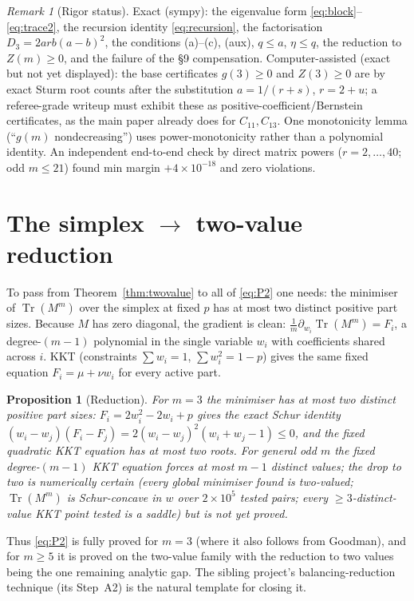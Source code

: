 \documentclass[11pt]{article}
\newtheorem{proposition}[theorem]{Proposition}
\theoremstyle{remark}
\newtheorem{remark}[theorem]{Remark}
\newcommand{\Tr}{\operatorname{Tr}}
\begin{document}
\begin{remark}[Rigor status]
Exact (sympy): the eigenvalue form \eqref{eq:block}--\eqref{eq:trace2}, the recursion identity \eqref{eq:recursion}, the factorisation $D_3=2arb(a-b)^2$, the conditions (a)--(c), (aux), $q\le a$, $\eta\le q$, the reduction to $Z(m)\ge0$, and the failure of the \S9 compensation.  Computer-assisted (exact but not yet displayed): the base certificates $g(3)\ge0$ and $Z(3)\ge0$ are by exact Sturm root counts after the substitution $a=1/(r+s)$, $r=2+u$; a referee-grade writeup must exhibit these as positive-coefficient/Bernstein certificates, as the main paper already does for $C_{11},C_{13}$.  One monotonicity lemma (``$g(m)$ nondecreasing'') uses power-monotonicity rather than a polynomial identity.  An independent end-to-end check by direct matrix powers ($r=2,\dots,40$; odd $m\le21$) found min margin $+4\times10^{-18}$ and zero violations.
\end{remark}

\section{The simplex $\to$ two-value reduction}\label{sec:reduction}

To pass from Theorem~\ref{thm:twovalue} to all of \eqref{eq:P2} one needs: the minimiser of $\Tr(M^m)$ over the simplex at fixed $p$ has at most two distinct positive part sizes.  Because $M$ has zero diagonal, the gradient is clean: $\tfrac1m\partial_{w_i}\Tr(M^m)=F_i$, a degree-$(m-1)$ polynomial in the single variable $w_i$ with coefficients shared across $i$.  KKT (constraints $\sum w_i=1$, $\sum w_i^2=1-p$) gives the same fixed equation $F_i=\mu+\nu w_i$ for every active part.

\begin{proposition}[Reduction]\label{prop:reduction}
For $m=3$ the minimiser has at most two distinct positive part sizes: $F_i=2w_i^2-2w_i+p$ gives the exact Schur identity $(w_i-w_j)(F_i-F_j)=2(w_i-w_j)^2(w_i+w_j-1)\le0$, and the fixed quadratic KKT equation has at most two roots.  For general odd $m$ the fixed degree-$(m-1)$ KKT equation forces at most $m-1$ distinct values; the drop to two is numerically certain (every global minimiser found is two-valued; $\Tr(M^m)$ is Schur-concave in $w$ over $2\times10^5$ tested pairs; every $\ge3$-distinct-value KKT point tested is a saddle) but is not yet proved.
\end{proposition}

Thus \eqref{eq:P2} is fully proved for $m=3$ (where it also follows from Goodman), and for $m\ge5$ it is proved on the two-value family with the reduction to two values being the one remaining analytic gap.  The sibling project's balancing-reduction technique (its Step~A2) is the natural template for closing it.
\end{document}
